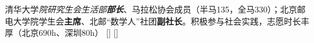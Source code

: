 \documentclass[zh]{resume}
\begin{document}
\begin{experiences}
  \separator{0.5ex}
    {清华大学\textit{院研究生会生活部\textbf{部长}}、马拉松协会成员（半马135，全马330）；北京邮电大学院学生会\textbf{主席}、北邮“数学人”社团\textbf{副社长}。积极参与社会实践，志愿时长丰厚（北京690h、深圳80h）}%
    []
    []
\end{experiences}
\end{document}
